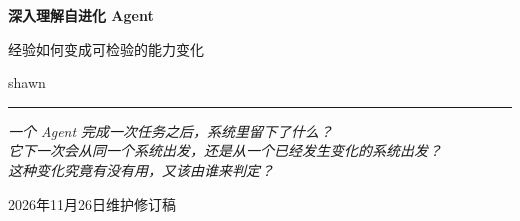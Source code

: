 \begin{titlepage}
\centering
\vspace*{3cm}

{\Huge\bfseries 深入理解自进化 Agent\par}
\vspace{0.8cm}
{\LARGE 经验如何变成可检验的能力变化\par}

\vspace{2.5cm}
{\large shawn\par}

\vspace{3cm}
\rule{0.6\textwidth}{0.4pt}

\vspace{0.5cm}
{\itshape
一个 Agent 完成一次任务之后，系统里留下了什么？\\
它下一次会从同一个系统出发，还是从一个已经发生变化的系统出发？\\
这种变化究竟有没有用，又该由谁来判定？\par}

\vfill
{\large 2026年11月26日维护修订稿\par}
\end{titlepage}
